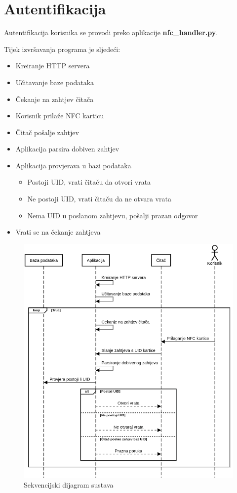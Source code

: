 \documentclass[times, utf8, zavrsni]{fer}
\begin{document}
\section{Autentifikacija}
Autentifikacija korisnika se provodi preko aplikacije \textbf{nfc\_handler.py}.\par
Tijek izvršavanja programa je sljedeći:
\begin{itemize}
\item Kreiranje HTTP servera
\item Učitavanje baze podataka
\item Čekanje na zahtjev čitača
\item Korisnik prilaže NFC karticu
\item Čitač pošalje zahtjev
\item Aplikacija parsira dobiven zahtjev
\item Aplikacija provjerava u bazi podataka 
   \begin{itemize}
   \item Postoji UID, vrati čitaču da otvori vrata
   \item Ne postoji UID, vrati čitaču da ne otvara vrata
   \item Nema UID u poslanom zahtjevu, pošalji prazan odgovor
   \end{itemize}
\item Vrati se na čekanje zahtjeva
\end{itemize}

\begin{figure}[h]
\includegraphics[scale=0.5]{sequence.png}
\centering
\caption{Sekvencijski dijagram sustava}
\centering
\end{figure}
\end{document}
